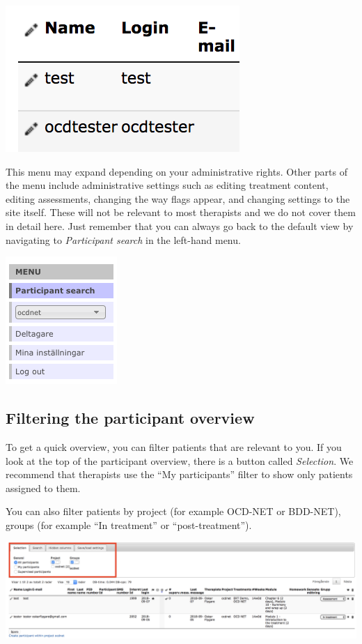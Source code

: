\documentclass[]{book}
\theoremstyle{definition}
\theoremstyle{definition}
\theoremstyle{definition}
\theoremstyle{remark}
\begin{document}
\includegraphics{images/pencil.png}

This menu may expand depending on your administrative rights. Other
parts of the menu include administrative settings such as editing
treatment content, editing assessments, changing the way flags appear,
and changing settings to the site itself. These will not be relevant to
most therapists and we do not cover them in detail here. Just remember
that you can always go back to the default view by navigating to
\emph{Participant search} in the left-hand menu.

\includegraphics{images/therapist-menu.png}

\hypertarget{filtering-the-participant-overview}{%
\subsection{Filtering the participant
overview}\label{filtering-the-participant-overview}}

To get a quick overview, you can filter patients that are relevant to
you. If you look at the top of the participant overview, there is a
button called \emph{Selection}. We recommend that therapists use the
``My participants'' filter to show only patients assigned to them.

You can also filter patients by project (for example OCD-NET or
BDD-NET), groups (for example ``In treatment'' or ``post-treatment'').

\includegraphics{images/filter-participants.png}
\end{document}

